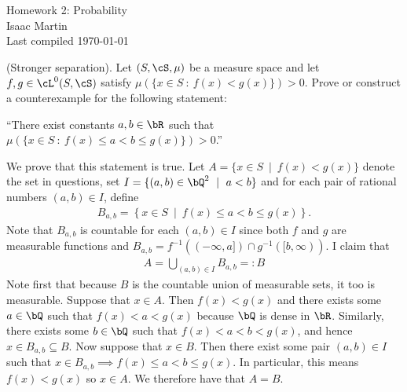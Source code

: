 \pagestyle{empty}
	\LARGE
\begin{center}
	Homework 2: Probability \\
	\Large
	Isaac Martin \\
    Last compiled \today
\end{center}
\normalsize
\vspace{-2mm}
\hru
{}
\begin{homework}[e]
	 (Stronger separation). Let $(S,\cS,\mu)$ be a measure space and let $f,g \in \cL^0(S,\cS)$ satisfy $\mu(\{x\in S ~:~ f(x) < g(x)\}) > 0$. Prove or construct a counterexample for the following statement:
	\begin{center}
		``There exist constants $a,b \in \bR$ such that $\mu(\{x \in S ~:~ f(x) \leq a < b \leq g(x)\}) > 0$.''
	\end{center}
	\begin{prf}
		We prove that this statement is true. Let $A = \{x \in S ~\mid~ f(x) < g(x)\}$ denote the set in questions, set $I = \{(a,b) \in \bQ^2 ~\mid~ a < b\}$ and for each pair of rational numbers $(a,b) \in I$, define
		\begin{align*}
			B_{a,b} = \left\{x \in S ~\mid~ f(x) \leq a < b \leq g(x)\right\}.
		\end{align*}
		Note that $B_{a,b}$ is countable for each $(a,b) \in I$ since both $f$ and $g$ are measurable functions and $B_{a,b} = f^{-1}((-\infty,a]) \cap g^{-1}([b,\infty))$. I claim that
		\begin{align*}
			A = \bigcup_{(a,b) \in I} B_{a,b} =: B
		\end{align*}
		Note first that because $B$ is the countable union of measurable sets, it too is measurable. Suppose that $x \in A$. Then $f(x) < g(x)$ and there exists some $a\in \bQ$ such that $f(x) < a < g(x)$ because $\bQ$ is dense in $\bR$. Similarly, there exists some $b \in \bQ$ such that $f(x) < a < b < g(x)$, and hence $x \in B_{a,b} \subseteq B$. Now suppose that $x \in B$. Then there exist some pair $(a,b) \in I$ such that $x \in B_{a,b}\implies f(x) \leq a < b \leq g(x)$. In particular, this means $f(x) < g(x)$ so $x \in A$. We therefore have that $A = B$.


\end{prf}
\end{homework}
